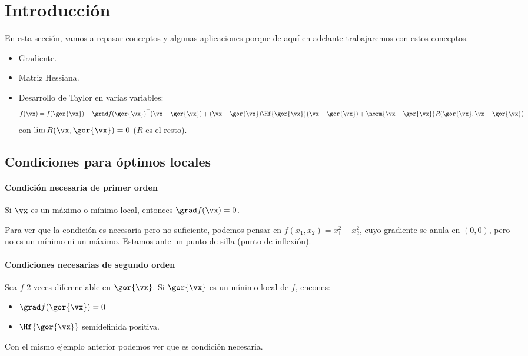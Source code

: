 \section{Introducción}

En esta sección, vamos a repasar conceptos y algunas aplicaciones porque de aquí en adelante trabajaremos con estos conceptos.


\begin{itemize}
	\item Gradiente.
	\item Matriz Hessiana.
	\item Desarrollo de Taylor en varias variables:
		\[
			f(\vx) = f(\gor{\vx}) + \grad f(\gor{\vx})^\top (\vx-\gor{\vx}) + (\vx-\gor{\vx})\Hf{\gor{\vx}}(\vx-\gor{\vx}) + \norm{\vx-\gor{\vx}}R(\gor{\vx},\vx-\gor{\vx})
		\]
		con $\displaystyle \lim R(\vx,\gor{\vx}) = 0$ ($R$ es el resto).
\end{itemize}

\subsection{Condiciones para óptimos locales}

\paragraph{Condición necesaria de primer orden}
Si $\vx$ es un máximo o mínimo local, entonces $\grad f(\vx) = 0$.

Para ver que la condición es necesaria pero no suficiente, podemos pensar en $f(x_1,x_2) = x_1^2 - x_2^2$, cuyo gradiente se anula en $(0,0)$, pero no es un mínimo ni un máximo. Estamos ante un punto de silla (punto de inflexión).


\paragraph{Condiciones necesarias de segundo orden} Sea $f$ 2 veces diferenciable en $\gor{\vx}$. Si $\gor{\vx}$ es un mínimo local de $f$, encones:
\begin{itemize}
	\item $\grad f(\gor{\vx}) = 0$
	\item $\Hf{\gor{\vx}}$ semidefinida positiva.
\end{itemize}

Con el mismo ejemplo anterior podemos ver que es condición necesaria.

